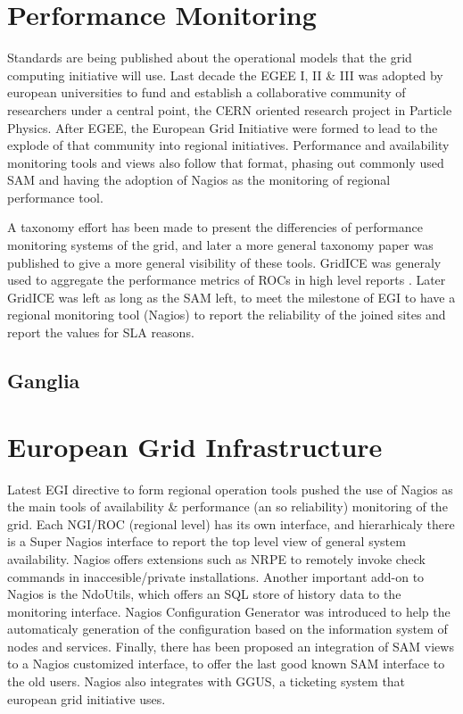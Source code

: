 \section{Performance Monitoring}
Standards are being published about the operational models that the grid
computing initiative will use. Last decade the EGEE I, II \& III was adopted by
european universities to fund and establish a collaborative community of
researchers under a central point, the CERN oriented research project in
Particle Physics. After EGEE, the European Grid Initiative were formed to lead
to the explode of that community into regional initiatives. Performance
and availability monitoring tools and views also follow that format, phasing out
commonly used SAM \cite{egee3dsa122} and having the adoption of Nagios as the
monitoring of regional performance tool.


A taxonomy effort has been made \cite{gerndt2004performance} to present the
differencies of performance monitoring systems of the grid, and later a more
general \cite{zanikolas2007importance} taxonomy paper was published to give a
more general visibility of these tools. GridICE was generaly used to aggregate
the performance metrics of ROCs in high level reports
\cite{andreozzi2005gridice}. Later GridICE was left as long as the SAM left, to
meet the milestone of EGI to have a regional monitoring tool (Nagios) to report
the reliability of the joined sites and report the values for SLA reasons.

\subsection{Ganglia}
\newpage

\section{European Grid Infrastructure}
Latest EGI directive to form regional operation tools pushed the use of Nagios
\cite{imamagic2007grid} as the main tools of availability \& performance (an so
reliability) monitoring of the grid. Each NGI/ROC (regional level) has its own
interface, and hierarhicaly there is a Super Nagios interface to report the top
level view of general system availability. Nagios offers extensions such as NRPE
to remotely invoke check commands in inaccesible/private installations.
Another important add-on to Nagios is the NdoUtils, which offers an SQL store
of history data to the monitoring interface. Nagios Configuration Generator was
introduced to help the automaticaly generation of the configuration based on
the information system of nodes and services. Finally, there has been proposed
an integration of SAM views to a Nagios customized interface, to offer the last
good known SAM interface to the old users. Nagios also integrates with GGUS, a
ticketing system that european grid initiative uses.

